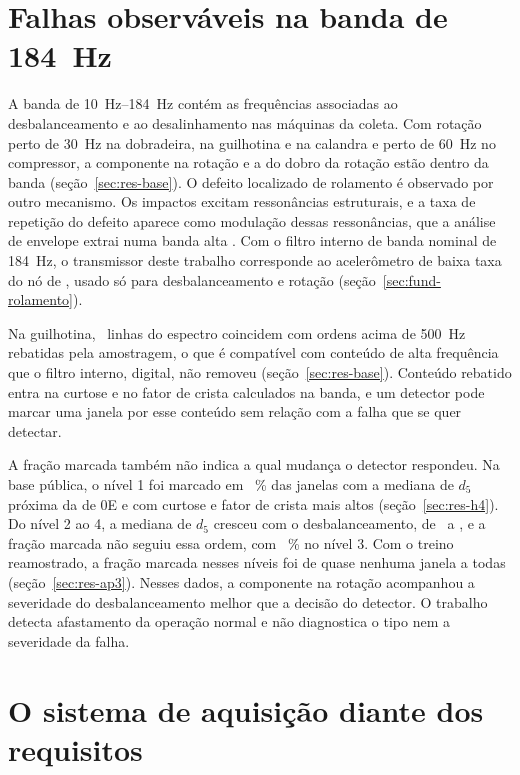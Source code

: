 \section{Falhas observáveis na banda de 184~Hz}\label{sec:disc-banda}

A banda de \SIrange{10}{184}{\hertz} contém as frequências associadas ao desbalanceamento e ao desalinhamento nas máquinas da coleta. Com rotação perto de \SI{30}{\hertz} na dobradeira, na guilhotina e na calandra e perto de \SI{60}{\hertz} no compressor, a componente na rotação e a do dobro da rotação estão dentro da banda (seção~\ref{sec:res-base}). O defeito localizado de rolamento é observado por outro mecanismo. Os impactos excitam ressonâncias estruturais, e a taxa de repetição do defeito aparece como modulação dessas ressonâncias, que a análise de envelope extrai numa banda alta \cite{randall2011}. Com o filtro interno de banda nominal de \SI{184}{\hertz}, o transmissor deste trabalho corresponde ao acelerômetro de baixa taxa do nó de , usado só para desbalanceamento e rotação (seção~\ref{sec:fund-rolamento}).

Na guilhotina, \picosRebatidos\ linhas do espectro coincidem com ordens acima de \SI{500}{\hertz} rebatidas pela amostragem, o que é compatível com conteúdo de alta frequência que o filtro interno, digital, não removeu (seção~\ref{sec:res-base}). Conteúdo rebatido entra na curtose e no fator de crista calculados na banda, e um detector pode marcar uma janela por esse conteúdo sem relação com a falha que se quer detectar.

A fração marcada também não indica a qual mudança o detector respondeu. Na base pública, o nível 1 foi marcado em \hQuatroFracaoUm~\% das janelas com a mediana de $d_5$ próxima da de 0E e com curtose e fator de crista mais altos (seção~\ref{sec:res-h4}). Do nível 2 ao 4, a mediana de $d_5$ cresceu com o desbalanceamento, de \hQuatroDcincoMedianaDois\ a \hQuatroDcincoMedianaQuatro, e a fração marcada não seguiu essa ordem, com \hQuatroFracaoTres~\% no nível 3. Com o treino reamostrado, a fração marcada nesses níveis foi de quase nenhuma janela a todas (seção~\ref{sec:res-ap3}). Nesses dados, a componente na rotação acompanhou a severidade do desbalanceamento melhor que a decisão do detector. O trabalho detecta afastamento da operação normal e não diagnostica o tipo nem a severidade da falha.

\section{O sistema de aquisição diante dos requisitos}\label{sec:disc-sistema}

